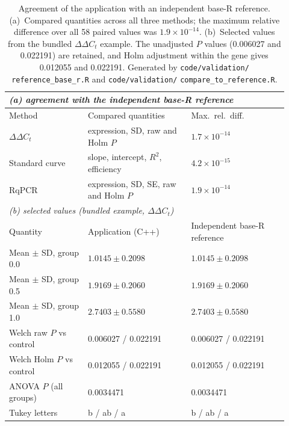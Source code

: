 \documentclass[11pt,a4paper]{article}
\begin{document}
\begin{table}[p]
\centering
\caption{Agreement of the application with an independent base-R reference.
(a)~Compared quantities across all three methods; the maximum relative
difference over all 58 paired values was $1.9 \times 10^{-14}$.
(b)~Selected values from the bundled $\Delta\Delta C_t$ example.
The unadjusted $P$ values (0.006027 and 0.022191) are retained, and Holm
adjustment within the gene gives 0.012055 and 0.022191.
Generated by \texttt{code/validation/}\allowbreak
\texttt{reference\_base\_r.R} and
\texttt{code/validation/}\allowbreak
\texttt{compare\_to\_reference.R}.}
\label{tab:s1}
\scriptsize
\setlength{\tabcolsep}{3pt}
\begin{tabular}{@{}p{0.26\linewidth}p{0.34\linewidth}p{0.32\linewidth}@{}}
\toprule
\multicolumn{3}{l}{\textit{(a) agreement with the independent base-R reference}}\\
\midrule
Method & Compared quantities & Max.\ rel.\ diff.\ \\
\midrule
$\Delta\Delta C_t$  & expression, SD, raw and Holm $P$    & $1.7 \times 10^{-14}$ \\
Standard curve      & slope, intercept, $R^2$, efficiency & $4.2 \times 10^{-15}$ \\
RqPCR               & expression, SD, SE, raw and Holm $P$ & $1.9 \times 10^{-14}$ \\
\midrule
\multicolumn{3}{l}{\textit{(b) selected values (bundled example, $\Delta\Delta C_t$)}}\\
\midrule
Quantity & Application (C++) & Independent base-R reference \\
\midrule
Mean $\pm$ SD, group 0.0   & $1.0145 \pm 0.2098$ & $1.0145 \pm 0.2098$ \\
Mean $\pm$ SD, group 0.5   & $1.9169 \pm 0.2060$ & $1.9169 \pm 0.2060$ \\
Mean $\pm$ SD, group 1.0   & $2.7403 \pm 0.5580$ & $2.7403 \pm 0.5580$ \\
Welch raw $P$ vs control   & 0.006027 / 0.022191 & 0.006027 / 0.022191 \\
Welch Holm $P$ vs control  & 0.012055 / 0.022191 & 0.012055 / 0.022191 \\
ANOVA $P$ (all groups)     & 0.0034471 & 0.0034471 \\
Tukey letters              & b / ab / a & b / ab / a \\
\bottomrule
\end{tabular}
\end{table}
\end{document}
